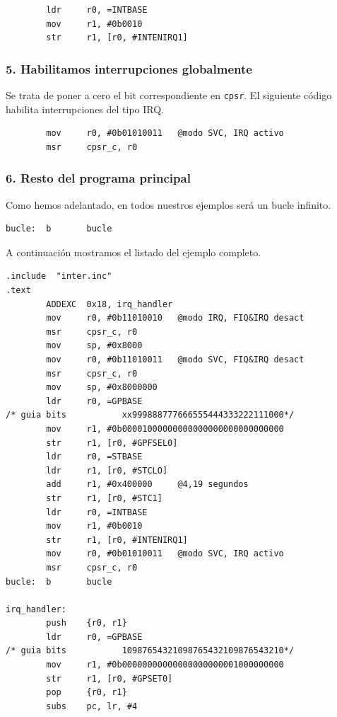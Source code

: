 \begin{lstlisting}
        ldr     r0, =INTBASE
        mov     r1, #0b0010
        str     r1, [r0, #INTENIRQ1]
\end{lstlisting}

\subsubsection{5. Habilitamos interrupciones globalmente}

Se trata de poner a cero el bit correspondiente en {\tt cpsr}. El siguiente código habilita
interrupciones del tipo IRQ.

\begin{lstlisting}
        mov     r0, #0b01010011   @modo SVC, IRQ activo
        msr     cpsr_c, r0
\end{lstlisting}

\subsubsection{6. Resto del programa principal}

Como hemos adelantado, en todos nuestros ejemplos será un bucle infinito.

\begin{lstlisting}
bucle:  b       bucle
\end{lstlisting}

A continuación mostramos el listado del ejemplo completo.

\begin{lstlisting}[caption={inter1.s},label={lst:codigoPract5_1}]
        .include  "inter.inc"
.text
        ADDEXC  0x18, irq_handler
        mov     r0, #0b11010010   @modo IRQ, FIQ&IRQ desact
        msr     cpsr_c, r0
        mov     sp, #0x8000
        mov     r0, #0b11010011   @modo SVC, FIQ&IRQ desact
        msr     cpsr_c, r0
        mov     sp, #0x8000000
        ldr     r0, =GPBASE
/* guia bits           xx999888777666555444333222111000*/
        mov     r1, #0b00001000000000000000000000000000
        str     r1, [r0, #GPFSEL0]
        ldr     r0, =STBASE
        ldr     r1, [r0, #STCLO]
        add     r1, #0x400000     @4,19 segundos
        str     r1, [r0, #STC1]
        ldr     r0, =INTBASE
        mov     r1, #0b0010
        str     r1, [r0, #INTENIRQ1]
        mov     r0, #0b01010011   @modo SVC, IRQ activo
        msr     cpsr_c, r0
bucle:  b       bucle

irq_handler:
        push    {r0, r1}
        ldr     r0, =GPBASE
/* guia bits           10987654321098765432109876543210*/
        mov     r1, #0b00000000000000000000001000000000
        str     r1, [r0, #GPSET0]
        pop     {r0, r1}
        subs    pc, lr, #4
\end{lstlisting}

